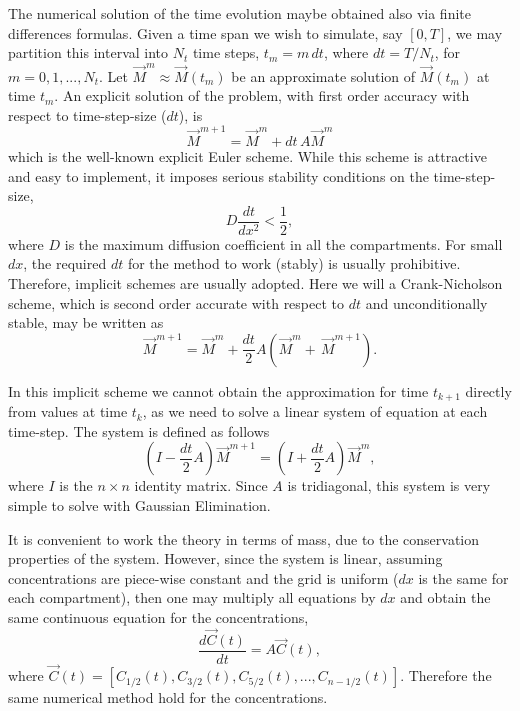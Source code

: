 \documentclass[final,1p,times]{elsarticle}
\begin{document}
The numerical solution of the time evolution maybe obtained also via finite differences formulas. Given a time span we wish to simulate, say $[0,T]$, we may partition this interval into $N_t$ time steps, $t_m=m\, dt$, where $dt=T/N_t$, for $m=0,1,...,N_t$. Let $\vec{M}^m\approx  \vec{M}(t_m)$ be an approximate solution of $\vec{M}(t_m)$ at time $t_m$. An explicit solution of the problem, with first order accuracy with respect to time-step-size ($dt$), is
\begin{equation}
\vec{M}^{m+1}=\vec{M}^m+dt \,A\vec{M}^m
\end{equation}
which is the well-known explicit Euler scheme. While this scheme is attractive and easy to implement, it imposes serious stability conditions on the time-step-size, 
\begin{equation}
D\frac{dt}{dx^2}<\frac{1}{2},
\end{equation} 
where $D$ is the maximum diffusion coefficient in all the compartments. For small $dx$, the required $dt$ for the method to work (stably) is usually prohibitive. Therefore, implicit schemes are usually adopted. Here we will a Crank-Nicholson scheme, which is second order accurate with respect to $dt$ and unconditionally stable, may be written as
\begin{equation}
\vec{M}^{m+1}=\vec{M}^m+\frac{dt}{2}A\left(\vec{M}^m+\,\vec{M}^{m+1}\right).
\end{equation}

In this implicit scheme we cannot obtain the approximation for time $t_{k+1}$ directly from values at time $t_k$, as we need to solve a linear system of equation at each time-step. The system is defined as follows
\begin{equation}
(I-\frac{dt}{2}A)\vec{M}^{m+1}=(I+\frac{dt}{2}A)\vec{M}^{m},
\end{equation}
where $I$ is the $n\times n$ identity matrix. Since $A$ is tridiagonal, this system is very simple to solve with Gaussian Elimination.

It is convenient to work the theory in terms of mass, due to the conservation properties of the system. However, since the system is linear, assuming concentrations are piece-wise constant and the grid is uniform ($dx$ is the same for each compartment), then one may multiply all equations by $dx$ and obtain the same continuous equation for the concentrations,
\begin{equation}
\frac{d \vec{C}(t)}{dt}=A\vec{C}(t),
\end{equation}
where $\vec{C}(t)=[C_{1/2}(t), C_{3/2}(t), C_{5/2}(t), ..., C_{n-1/2}(t)]$. Therefore the same numerical method hold for the concentrations.
\end{document}
